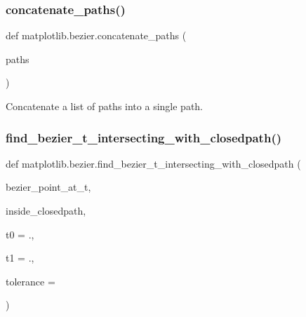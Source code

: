\subsubsection{\texorpdfstring{concatenate\+\_\+paths()}{concatenate\_paths()}}
{\footnotesize\ttfamily def matplotlib.\+bezier.\+concatenate\+\_\+paths (\begin{DoxyParamCaption}\item[{}]{paths }\end{DoxyParamCaption})}

\begin{DoxyVerb}Concatenate a list of paths into a single path.\end{DoxyVerb}
 \mbox{\label{namespacematplotlib_1_1bezier_a9077f52d0ef522b7490a79c9075863d9}} 
\subsubsection{\texorpdfstring{find\+\_\+bezier\+\_\+t\+\_\+intersecting\+\_\+with\+\_\+closedpath()}{find\_bezier\_t\_intersecting\_with\_closedpath()}}
{\footnotesize\ttfamily def matplotlib.\+bezier.\+find\+\_\+bezier\+\_\+t\+\_\+intersecting\+\_\+with\+\_\+closedpath (\begin{DoxyParamCaption}\item[{}]{bezier\+\_\+point\+\_\+at\+\_\+t,  }\item[{}]{inside\+\_\+closedpath,  }\item[{}]{t0 = {.},  }\item[{}]{t1 = {.},  }\item[{}]{tolerance = {} }\end{DoxyParamCaption})}

